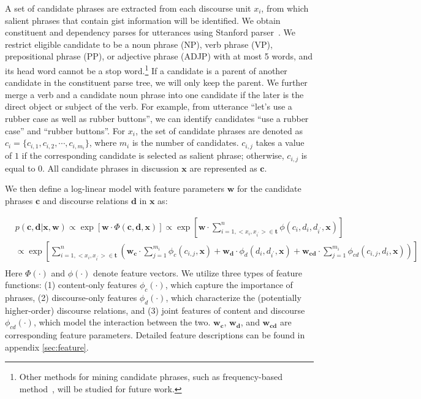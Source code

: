 A set of candidate phrases are extracted from each discourse unit $x_{i}$, from which salient phrases that contain gist information will be identified. We obtain constituent and dependency parses for utterances using Stanford parser~\cite{Klein:2003:AUP:1075096.1075150}. We restrict eligible candidate to be a noun phrase (NP), verb phrase (VP), prepositional phrase (PP), or adjective phrase (ADJP) with at most 5 words, and its head word cannot be a stop word.\footnote{Other methods for mining candidate phrases, such as frequency-based method~\cite{liu2015mining}, will be studied for future work.} 
If a candidate is a parent of another candidate in the constituent parse tree, we will only keep the parent. We further merge a verb and a candidate noun phrase into one candidate if the later is the direct object or subject of the verb. For example, from utterance ``let's use a rubber case as well as rubber buttons'', we can identify candidates ``use a rubber case'' and ``rubber buttons''. 
For $x_{i}$, the set of candidate phrases are denoted as $c_{i}=\{c_{i,1},c_{i,2},\cdots,c_{i,m_i}\}$, where $m_i$ is the number of candidates. $c_{i,j}$ takes a value of $1$ if the corresponding candidate is selected as salient phrase; otherwise, $c_{i,j}$ is equal to $0$. All candidate phrases in discussion $\mathbf{x}$ are represented as $\mathbf{c}$.


We then define a log-linear model with feature parameters $\mathbf{w}$ for the candidate phrases $\mathbf{c}$ and discourse relations $\mathbf{d}$ in $\mathbf{x}$ as:

{\fontsize{10}{10}\selectfont
\begin{equation}
\begin{split}
& p(\mathbf{c}, \mathbf{d}|\mathbf{x}, \mathbf{w}) \propto \exp [\mathbf{w}\cdot \Phi (\mathbf{c}, \mathbf{d}, \mathbf{x})] \propto \exp [\mathbf{w}\cdot \sum_{i=1, <x_i, x_{i^\prime}>\in \mathbf{t}}^{n} \phi (c_{i}, d_{i}, d_{i^\prime}, \mathbf{x})]\\
& \propto \exp [\sum_{i=1,<x_i, x_{i^\prime}>\in \mathbf{t}}^{n} ( \mathbf{w_c}\cdot \sum_{j=1}^{m_i} \phi_c (c_{i,j}, \mathbf{x})+ \mathbf{w_d}\cdot \phi_d (d_{i},d_{i^\prime}, \mathbf{x}) + \mathbf{w_{cd}}\cdot \sum_{j=1}^{m_i} \phi_{cd} (c_{i,j}, d_{i}, \mathbf{x}) ) ]\\
\end{split}
\end{equation}
\label{eq:objective}
}
%
Here $\Phi(\cdot)$ and $\phi(\cdot)$ denote feature vectors. We utilize three types of feature functions: (1) content-only features $\phi_c(\cdot)$, which capture the importance of phrases, (2) discourse-only features $\phi_d(\cdot)$, which characterize the (potentially higher-order) discourse relations, and (3) joint features of content and discourse $\phi_{cd}(\cdot)$, which model the interaction between the two. $\mathbf{w_c}$, $\mathbf{w_d}$, and $\mathbf{w_{cd}}$ are corresponding feature parameters. Detailed feature descriptions can be found in appendix \ref{sec:feature}. 

